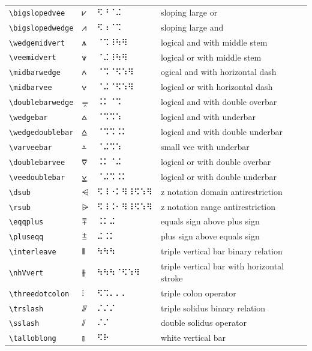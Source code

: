 \documentclass[oneside]{article}
\begin{document}
\begin{longtable}{llll}
\verb|\bigslopedvee| & $\bigslopedvee$ &  ⠫⠘⠈⠬  & {sloping large or} \\[2ex]
\verb|\bigslopedwedge| & $\bigslopedwedge$ &  ⠫⠰⠈⠩  & {sloping large and} \\[2ex]
\verb|\wedgemidvert| & $\wedgemidvert$ &  ⠈⠩⠸⠳⠻  & {logical and with middle stem} \\[2ex]
\verb|\veemidvert| & $\veemidvert$ &  ⠈⠬⠸⠳⠻  & {logical or with middle stem} \\[2ex]
\verb|\midbarwedge| & $\midbarwedge$ &  ⠈⠩⠈⠫⠱⠻  & {ogical and with horizontal dash} \\[2ex]
\verb|\midbarvee| & $\midbarvee$ &  ⠈⠬⠈⠫⠱⠻  & {logical or with horizontal dash} \\[2ex]
\verb|\doublebarwedge| & $\doublebarwedge$ &  ⠨⠅⠈⠩  & {logical and with double overbar} \\[2ex]
\verb|\wedgebar| & $\wedgebar$ &  ⠈⠩⠩⠱  & {logical and with underbar} \\[2ex]
\verb|\wedgedoublebar| & $\wedgedoublebar$ &  ⠈⠩⠩⠨⠅  & {logical and with double underbar} \\[2ex]
\verb|\varveebar| & $\varveebar$ &  ⠈⠬⠩⠱  & {small vee with underbar} \\[2ex]
\verb|\doublebarvee| & $\doublebarvee$ &  ⠨⠅⠈⠬  & {logical or with double overbar} \\[2ex]
\verb|\veedoublebar| & $\veedoublebar$ &  ⠈⠬⠩⠨⠅  & {logical or with double underbar} \\[2ex]
\verb|\dsub| & $\dsub$ &  ⠫⠸⠐⠅⠻⠸⠫⠱⠻  & {z notation domain antirestriction} \\[2ex]
\verb|\rsub| & $\rsub$ &  ⠫⠸⠨⠂⠻⠸⠫⠱⠻  & {z notation range antirestriction} \\[2ex]
\verb|\eqqplus| & $\eqqplus$ &  ⠨⠅⠬  & {equals sign above plus sign} \\[2ex]
\verb|\pluseqq| & $\pluseqq$ &  ⠬⠨⠅  & {plus sign above equals sign} \\[2ex]
\verb|\interleave| & $\interleave$ &  ⠳⠳⠳  & {triple vertical bar binary relation} \\[2ex]
\verb|\nhVvert| & $\nhVvert$ &  ⠳⠳⠳⠈⠫⠱⠻  & {triple vertical bar with horizontal stroke} \\[2ex]
\verb|\threedotcolon| & $\threedotcolon$ &  ⠫⠩⠄⠄⠄  & {triple colon operator} \\[2ex]
\verb|\trslash| & $\trslash$ &  ⠌⠌⠌  & {triple solidus binary relation} \\[2ex]
\verb|\sslash| & $\sslash$ &  ⠌⠌  & {double solidus operator} \\[2ex]
\verb|\talloblong| & $\talloblong$ &  ⠫⠗  & {white vertical bar} \\[2ex]
\end{longtable}
\end{document}
